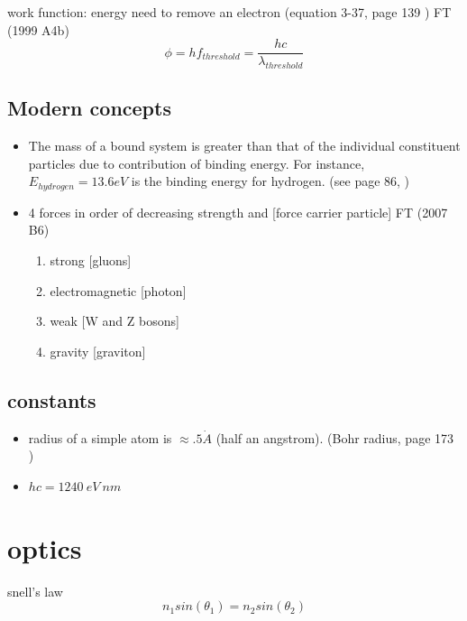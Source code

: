 \documentclass[12pt]{article}  %
\def\qualifyingyear{F}
\begin{document}
work function: energy need to remove an electron
(equation 3-37, page 139 \cite{TiplerMP}) 
\if\qualifyingyear T
(1999 A4b)
\fi
\begin{equation}
\phi = h f_{threshold} = \frac{h c}{\lambda_{threshold}}
\end{equation}

\subsection{Modern concepts}
\begin{itemize}
\item The mass of a bound system is greater than that of the individual
constituent particles due to contribution of binding energy. For
instance, $E_{hydrogen} = 13.6 eV$ is the binding energy for
hydrogen. (see page 86, \cite{TiplerMP})
\item 4 forces in order of decreasing strength and [force carrier particle] 
\if\qualifyingyear T
(2007 B6)
\fi
\begin{enumerate}
	\item strong [gluons]
	\item electromagnetic [photon]
	\item weak [W and Z bosons]
	\item gravity [graviton]
\end{enumerate}
\end{itemize}

\subsection{constants}
\begin{itemize}
\item radius of a simple atom is $\approx .5 \dot{A}$ (half an angstrom).
(Bohr radius, page 173 \cite{TiplerMP})
\item $hc = 1240 \ eV \ nm$
\end{itemize}

\section{optics}

snell's law
\begin{equation}
n_1 sin(\theta_1)=n_2 sin(\theta_2)
\end{equation}
\end{document}
